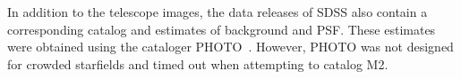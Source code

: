 



In addition to the telescope images, the data releases of SDSS also contain 
a corresponding catalog and estimates of background and PSF. These estimates were obtained using the cataloger PHOTO~\cite{lupton2001sdss}. However, PHOTO was not designed for crowded starfields and timed out when attempting to catalog M2. 

